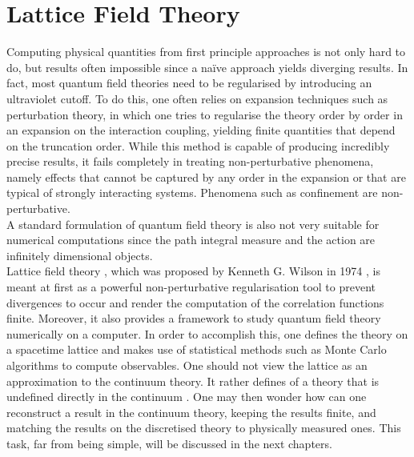 \section{Lattice Field Theory}
Computing physical quantities from first principle approaches is not only hard to do, but results often impossible since a na\"ive approach yields diverging results. In fact, most quantum field theories need to be regularised by introducing an ultraviolet cutoff. To do this, one often relies on expansion techniques such as perturbation theory, in which one tries to regularise the theory order by order in an expansion on the interaction coupling, yielding finite quantities that depend on the truncation order.  While this method is capable of producing incredibly precise results, it fails completely in treating non-perturbative phenomena, namely effects that cannot be captured by any order in the expansion or that are typical of strongly interacting systems.
Phenomena such as confinement are non-perturbative.\\
A standard formulation of quantum field theory is also not very suitable for numerical computations since the path integral measure and the action are infinitely dimensional objects. \\
Lattice field theory \cite{Montvay1994QuantumLattice,rothe_LGT,gattringer_LQCD,creutz_2023}, which was proposed by Kenneth G. Wilson in 1974 \cite{wilson_lqcd}, is meant at first as a powerful non-perturbative regularisation tool to prevent divergences to occur and render the computation of the correlation functions finite. Moreover, it also provides a framework to study quantum field theory numerically on a computer. In order to accomplish this, one defines the theory on a spacetime lattice and makes use of statistical methods such as Monte Carlo algorithms to compute observables. 
One should not view the lattice as an approximation to the continuum theory. It rather defines of a theory that is undefined directly in the continuum \cite{Wiese:2009qsa}. One may then wonder how can one reconstruct a result in the continuum theory, keeping the results finite, and matching the results on the discretised theory to physically measured ones. This task, far from being simple, will be  discussed in the next chapters.\


